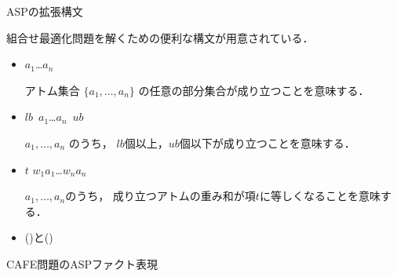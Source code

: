 \documentclass[dvipdfmx, 11pt]{beamer}
\begin{document}
\begin{frame}{ASPの拡張構文}
  \begin{alertblock}{}\centering
    組合せ最適化問題を解くための便利な構文が用意されている．
  \end{alertblock}

  \begin{itemize}
 \item {}
   \begin{center}
     \code{\{}$a_1$\code{;}\ldots\code{;}$a_n$\code{\}}
   \end{center}
   アトム集合 $\{a_1,\dots,a_n\}$
   の任意の部分集合が成り立つことを意味する．
 \item {}
   \begin{center}
     $lb$\ \code{\{}$a_1$\code{;}\ldots\code{;}$a_n$\code{\}}\ $ub$
   \end{center}
   $a_1,\dots,a_n$ のうち，
   $lb$個以上，$ub$個以下が成り立つことを意味する．
 \item {}
   \begin{center}
     $t$  \code{\{} $w_1$\code{:}$a_1$\code{;}\ldots\code{;}$w_n$\code{:}$a_n$ \code{\}}
   \end{center}
   $a_1,\dots,a_n$のうち，
   成り立つアトムの重み和が項$t$に等しくなることを意味する．
 \item {}()と()
 \end{itemize}

\end{frame}
\begin{frame}{CAFE問題のASPファクト表現}
  \begin{multicols}{2}
    \scriptsize
    
  \end{multicols}
\end{frame}
\end{document}
